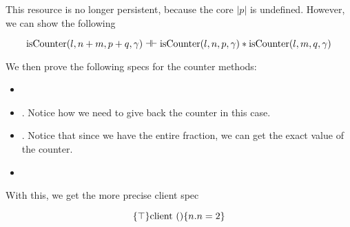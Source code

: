 This resource is no longer persistent, because the core $|p|$ is undefined. However, we can show the following

\[ \text{isCounter}(l, n + m, p + q, \gamma) \dashv \vdash  \text{isCounter}(l, n, p, \gamma) *  \text{isCounter}(l, m, q, \gamma)    \] 

We then prove the following specs for the counter methods:
\begin{itemize}
\item {}

\item {}. Notice how we need to give back the counter in this case.

\item {}. Notice that since we have the entire fraction, we can get the exact value of the counter.


\item {}
\end{itemize}

With this, we get the more precise client spec

\[ \{\top\} \text{client} \text{ } () \{n. n = 2\} \]
